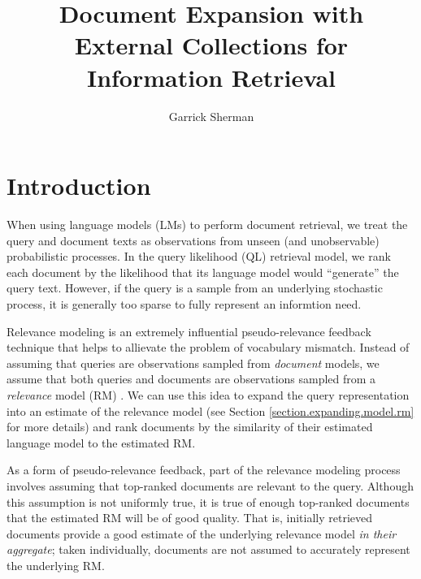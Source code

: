 \documentclass{sig-alternate}
\begin{document}
\author{Garrick Sherman}

\title{Document Expansion with External Collections for Information Retrieval}

\maketitle
\begin{abstract}
\end{abstract}

\section{Introduction}\label{section.intro}

When using language models (LMs) to perform document retrieval, we treat the query and document texts as observations from unseen (and unobservable) probabilistic processes. In the query likelihood (QL) retrieval model, we rank each document by the likelihood that its language model would ``generate'' the query text. However, if the query is a sample from an underlying stochastic process, it is generally too sparse to fully represent an informtion need.

Relevance modeling is an extremely influential pseudo-relevance feedback technique that helps to allievate the problem of vocabulary mismatch. Instead of assuming that queries are observations sampled from \textit{document} models, we assume that both queries and documents are observations sampled from a \textit{relevance} model (RM) \cite{Lavrenko2001}. We can use this idea to expand the query representation into an estimate of the relevance model (see Section \ref{section.expanding.model.rm} for more details) and rank documents by the similarity of their estimated language model to the estimated RM.

As a form of pseudo-relevance feedback, part of the relevance modeling process involves assuming that top-ranked documents are relevant to the query. Although this assumption is not uniformly true, it is true of enough top-ranked documents that the estimated RM will be of good quality. That is, initially retrieved documents provide a good estimate of the underlying relevance model \textit{in their aggregate}; taken individually, documents are not assumed to accurately represent the underlying RM.

\end{document}
